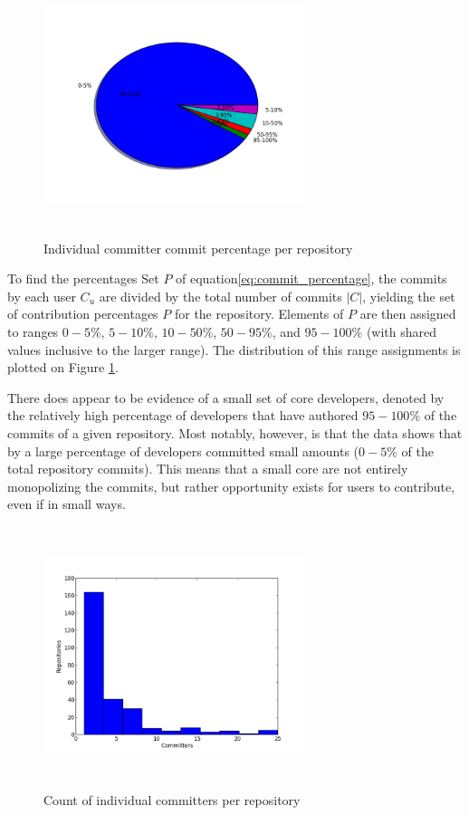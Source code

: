 \documentclass{proc}
\begin{document}
{{{{{\begin{figure}
\includegraphics[height=3in,width=3in]{images/committers_percentage_pie_chart.png}
\caption{Individual committer commit percentage per repository}
\label{fig:committers_percentage_pie_chart}
\end{figure}

To find the percentages Set $P$ of equation\ref{eq:commit_percentage}, the commits by each user $C_u$ are divided by the total number of commits $|C|$, yielding the set of contribution percentages $P$ for the repository. Elements of $P$ are then assigned to ranges $0-5\%$, $5-10\%$, $10-50\%$, $50-95\%$, and $95-100\%$ (with shared values inclusive to the larger range). The distribution of this range assignments is plotted on Figure \ref{fig:committers_percentage_pie_chart}.

There does appear to be evidence of a small set of core developers, denoted by the relatively high percentage of developers that have authored $95-100\%$ of the commits of a given repository. Most notably, however, is that the data shows that by a large percentage of developers committed small amounts ($0-5\%$ of the total repository commits). This means that a small core are not entirely monopolizing the commits, but rather opportunity exists for users to contribute, even if in small ways.

\begin{figure}
\includegraphics[height=3in,width=3in]{images/committers_histogram.png}
\caption{Count of individual committers per repository}
\label{fig:committers_histogram}
\end{figure}

}}}}}
\end{document}
